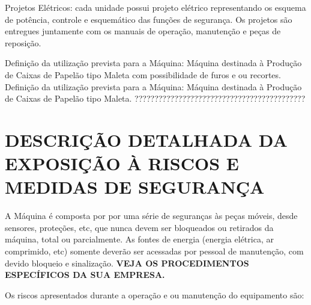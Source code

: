 Projetos Elétricos: cada unidade possui projeto elétrico representando os esquema de potência, controle e esquemático das
 funções de segurança. Os projetos são entregues juntamente com os manuais de operação, manutenção e
 peças de reposição.

 \ifmachineType

  \ifunidadePerfuradora
       Definição da utilização prevista para a Máquina:
 Máquina destinada à Produção de Caixas de Papelão tipo Maleta com possibilidade de furos e ou recortes.
 \else
 Definição da utilização prevista para a Máquina:
 Máquina destinada à Produção de Caixas de Papelão tipo Maleta.
    \fi
\else
???????????????????????????????????????????
\fi

\newpage

\thispagestyle{fancy}

\vspace*{40 pt}

\section{\large{\MakeUppercase{Descrição detalhada da Exposição à Riscos e Medidas de Segurança}}}

A Máquina é composta por por uma série de seguranças às peças móveis, desde sensores, proteções, etc, que nunca devem
ser bloqueados ou retirados da máquina, total ou parcialmente. As fontes de energia (energia elétrica, ar comprimido, etc)
somente deverão ser acessadas por pessoal de manutenção, com devido bloqueio e sinalização.
\textbf{VEJA OS PROCEDIMENTOS ESPECÍFICOS DA SUA EMPRESA.}

Os riscos apresentados durante a operação e ou manutenção do equipamento são:



